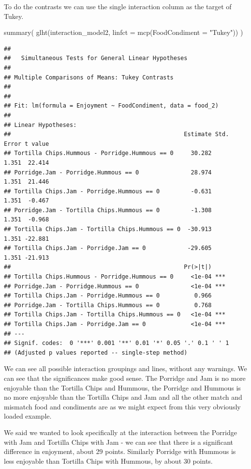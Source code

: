 \documentclass[
]{book}
\newenvironment{Shaded}{\begin{snugshade}}{\end{snugshade}}
\newcommand{\AttributeTok}[1]{\textcolor[rgb]{0.77,0.63,0.00}{#1}}
\newcommand{\FunctionTok}[1]{\textcolor[rgb]{0.00,0.00,0.00}{#1}}
\newcommand{\NormalTok}[1]{#1}
\newcommand{\StringTok}[1]{\textcolor[rgb]{0.31,0.60,0.02}{#1}}
\begin{document}
To do the contrasts we can use the single interaction column as the target of Tukey.

\begin{Shaded}
\begin{Highlighting}[]
\FunctionTok{summary}\NormalTok{(}
  \FunctionTok{glht}\NormalTok{(interaction\_model2, }\AttributeTok{linfct =} \FunctionTok{mcp}\NormalTok{(}\AttributeTok{FoodCondiment =} \StringTok{"Tukey"}\NormalTok{))}
\NormalTok{  )}
\end{Highlighting}
\end{Shaded}

\begin{verbatim}
## 
## 	 Simultaneous Tests for General Linear Hypotheses
## 
## Multiple Comparisons of Means: Tukey Contrasts
## 
## 
## Fit: lm(formula = Enjoyment ~ FoodCondiment, data = food_2)
## 
## Linear Hypotheses:
##                                                  Estimate Std. Error t value
## Tortilla Chips.Hummous - Porridge.Hummous == 0     30.282      1.351  22.414
## Porridge.Jam - Porridge.Hummous == 0               28.974      1.351  21.446
## Tortilla Chips.Jam - Porridge.Hummous == 0         -0.631      1.351  -0.467
## Porridge.Jam - Tortilla Chips.Hummous == 0         -1.308      1.351  -0.968
## Tortilla Chips.Jam - Tortilla Chips.Hummous == 0  -30.913      1.351 -22.881
## Tortilla Chips.Jam - Porridge.Jam == 0            -29.605      1.351 -21.913
##                                                  Pr(>|t|)    
## Tortilla Chips.Hummous - Porridge.Hummous == 0     <1e-04 ***
## Porridge.Jam - Porridge.Hummous == 0               <1e-04 ***
## Tortilla Chips.Jam - Porridge.Hummous == 0          0.966    
## Porridge.Jam - Tortilla Chips.Hummous == 0          0.768    
## Tortilla Chips.Jam - Tortilla Chips.Hummous == 0   <1e-04 ***
## Tortilla Chips.Jam - Porridge.Jam == 0             <1e-04 ***
## ---
## Signif. codes:  0 '***' 0.001 '**' 0.01 '*' 0.05 '.' 0.1 ' ' 1
## (Adjusted p values reported -- single-step method)
\end{verbatim}

We can see all possible interaction groupings and lines, without any warnings. We can see that the significances make good sense. The Porridge and Jam is no more enjoyable than the Tortilla Chips and Hummous, the Porridge and Hummous is no more enjoyable than the Tortilla Chips and Jam and all the other match and mismatch food and condiments are as we might expect from this very obviously loaded example.

We said we wanted to look specifically at the interaction between the Porridge with Jam and Tortilla Chips with Jam - we can see that there is a significant difference in enjoyment, about 29 points. Similarly Porridge with Hummous is less enjoyable than Tortilla Chips with Hummous, by about 30 points.
\end{document}
